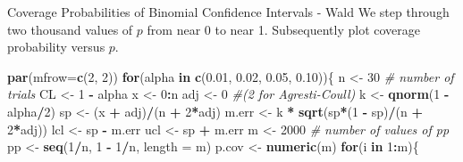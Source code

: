 \documentclass[
  ignorenonframetext,
]{beamer}
\newenvironment{Shaded}{\begin{snugshade}}{\end{snugshade}}
\newcommand{\AttributeTok}[1]{\textcolor[rgb]{0.13,0.29,0.53}{#1}}
\newcommand{\CommentTok}[1]{\textcolor[rgb]{0.56,0.35,0.01}{\textit{#1}}}
\newcommand{\ControlFlowTok}[1]{\textcolor[rgb]{0.13,0.29,0.53}{\textbf{#1}}}
\newcommand{\DecValTok}[1]{\textcolor[rgb]{0.00,0.00,0.81}{#1}}
\newcommand{\FloatTok}[1]{\textcolor[rgb]{0.00,0.00,0.81}{#1}}
\newcommand{\FunctionTok}[1]{\textcolor[rgb]{0.13,0.29,0.53}{\textbf{#1}}}
\newcommand{\NormalTok}[1]{#1}
\newcommand{\OtherTok}[1]{\textcolor[rgb]{0.56,0.35,0.01}{#1}}
\newcommand{\SpecialCharTok}[1]{\textcolor[rgb]{0.81,0.36,0.00}{\textbf{#1}}}
\begin{document}
\begin{frame}[fragile]{Coverage Probabilities of Binomial Confidence
Intervals - Wald}
\label{coverage-probabilities-of-binomial-confidence-intervals---wald}
We step through two thousand values of \(p\) from near 0 to near 1.
Subsequently plot coverage probability versus \(p\).

\tiny

\begin{Shaded}
\begin{Highlighting}[]
\FunctionTok{par}\NormalTok{(}\AttributeTok{mfrow=}\FunctionTok{c}\NormalTok{(}\DecValTok{2}\NormalTok{, }\DecValTok{2}\NormalTok{))}
\ControlFlowTok{for}\NormalTok{(alpha }\ControlFlowTok{in} \FunctionTok{c}\NormalTok{(}\FloatTok{0.01}\NormalTok{, }\FloatTok{0.02}\NormalTok{, }\FloatTok{0.05}\NormalTok{, }\FloatTok{0.10}\NormalTok{))\{}
\NormalTok{n }\OtherTok{\textless{}{-}} \DecValTok{30}     \CommentTok{\# number of trials}
\NormalTok{CL }\OtherTok{\textless{}{-}} \DecValTok{1} \SpecialCharTok{{-}}\NormalTok{ alpha}
\NormalTok{x }\OtherTok{\textless{}{-}} \DecValTok{0}\SpecialCharTok{:}\NormalTok{n }
\NormalTok{adj }\OtherTok{\textless{}{-}} \DecValTok{0}    \CommentTok{\#(2 for Agresti{-}Coull)}
\NormalTok{k }\OtherTok{\textless{}{-}} \FunctionTok{qnorm}\NormalTok{(}\DecValTok{1} \SpecialCharTok{{-}}\NormalTok{ alpha}\SpecialCharTok{/}\DecValTok{2}\NormalTok{)}
\NormalTok{sp }\OtherTok{\textless{}{-}}\NormalTok{ (x }\SpecialCharTok{+}\NormalTok{ adj)}\SpecialCharTok{/}\NormalTok{(n }\SpecialCharTok{+} \DecValTok{2}\SpecialCharTok{*}\NormalTok{adj)}
\NormalTok{m.err }\OtherTok{\textless{}{-}}\NormalTok{ k }\SpecialCharTok{*} \FunctionTok{sqrt}\NormalTok{(sp}\SpecialCharTok{*}\NormalTok{(}\DecValTok{1} \SpecialCharTok{{-}}\NormalTok{ sp)}\SpecialCharTok{/}\NormalTok{(n }\SpecialCharTok{+} \DecValTok{2}\SpecialCharTok{*}\NormalTok{adj))}
\NormalTok{lcl }\OtherTok{\textless{}{-}}\NormalTok{ sp }\SpecialCharTok{{-}}\NormalTok{ m.err}
\NormalTok{ucl }\OtherTok{\textless{}{-}}\NormalTok{ sp }\SpecialCharTok{+}\NormalTok{ m.err}
\NormalTok{m }\OtherTok{\textless{}{-}} \DecValTok{2000} \CommentTok{\# number of values of pp}
\NormalTok{pp }\OtherTok{\textless{}{-}} \FunctionTok{seq}\NormalTok{(}\DecValTok{1}\SpecialCharTok{/}\NormalTok{n, }\DecValTok{1} \SpecialCharTok{{-}} \DecValTok{1}\SpecialCharTok{/}\NormalTok{n, }\AttributeTok{length =}\NormalTok{ m)}
\NormalTok{p.cov }\OtherTok{\textless{}{-}} \FunctionTok{numeric}\NormalTok{(m)}
\ControlFlowTok{for}\NormalTok{(i }\ControlFlowTok{in} \DecValTok{1}\SpecialCharTok{:}\NormalTok{m)\{}

\end{Highlighting}
\end{Shaded}
\end{frame}
\end{document}
